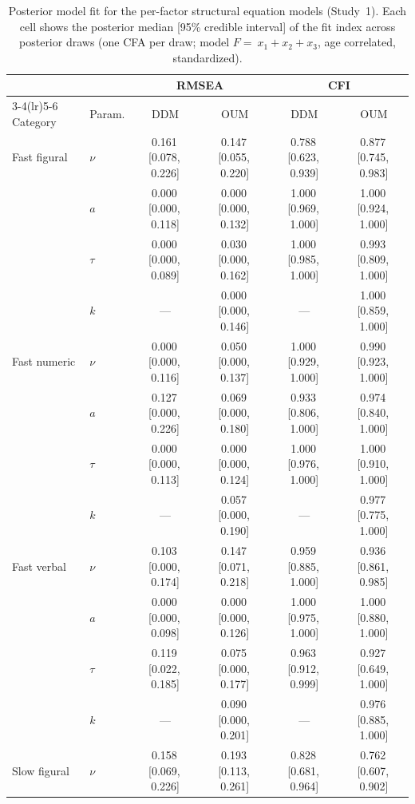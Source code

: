 \begin{table}[ht]
\centering
\caption{Posterior model fit for the per-factor structural equation models (Study~1). Each cell shows the posterior median [95\% credible interval] of the fit index across posterior draws (one CFA per draw; model $F =~ x_1+x_2+x_3$, age correlated, standardized).}
\label{tab:sem_fit}
\small
\setlength{\tabcolsep}{4pt}
\begin{tabular}{ll cc cc}
\toprule
 & & \multicolumn{2}{c}{RMSEA} & \multicolumn{2}{c}{CFI} \\
\cmidrule(lr){3-4}\cmidrule(lr){5-6}
Category & Param. & DDM & OUM & DDM & OUM \\
\midrule
Fast figural & $\nu$ & 0.161\,[0.078,\,0.226] & 0.147\,[0.055,\,0.220] & 0.788\,[0.623,\,0.939] & 0.877\,[0.745,\,0.983] \\
 & $a$ & 0.000\,[0.000,\,0.118] & 0.000\,[0.000,\,0.132] & 1.000\,[0.969,\,1.000] & 1.000\,[0.924,\,1.000] \\
 & $\tau$ & 0.000\,[0.000,\,0.089] & 0.030\,[0.000,\,0.162] & 1.000\,[0.985,\,1.000] & 0.993\,[0.809,\,1.000] \\
 & $k$ & --- & 0.000\,[0.000,\,0.146] & --- & 1.000\,[0.859,\,1.000] \\
\addlinespace
Fast numeric & $\nu$ & 0.000\,[0.000,\,0.116] & 0.050\,[0.000,\,0.137] & 1.000\,[0.929,\,1.000] & 0.990\,[0.923,\,1.000] \\
 & $a$ & 0.127\,[0.000,\,0.226] & 0.069\,[0.000,\,0.180] & 0.933\,[0.806,\,1.000] & 0.974\,[0.840,\,1.000] \\
 & $\tau$ & 0.000\,[0.000,\,0.113] & 0.000\,[0.000,\,0.124] & 1.000\,[0.976,\,1.000] & 1.000\,[0.910,\,1.000] \\
 & $k$ & --- & 0.057\,[0.000,\,0.190] & --- & 0.977\,[0.775,\,1.000] \\
\addlinespace
Fast verbal & $\nu$ & 0.103\,[0.000,\,0.174] & 0.147\,[0.071,\,0.218] & 0.959\,[0.885,\,1.000] & 0.936\,[0.861,\,0.985] \\
 & $a$ & 0.000\,[0.000,\,0.098] & 0.000\,[0.000,\,0.126] & 1.000\,[0.975,\,1.000] & 1.000\,[0.880,\,1.000] \\
 & $\tau$ & 0.119\,[0.022,\,0.185] & 0.075\,[0.000,\,0.177] & 0.963\,[0.912,\,0.999] & 0.927\,[0.649,\,1.000] \\
 & $k$ & --- & 0.090\,[0.000,\,0.201] & --- & 0.976\,[0.885,\,1.000] \\
\addlinespace
Slow figural & $\nu$ & 0.158\,[0.069,\,0.226] & 0.193\,[0.113,\,0.261] & 0.828\,[0.681,\,0.964] & 0.762\,[0.607,\,0.902] \\

\end{tabular}
\end{table}
